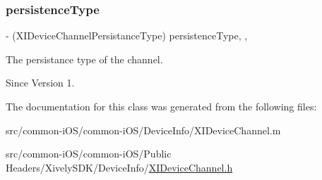 \subsubsection{\texorpdfstring{persistence\+Type}{persistenceType}}
{\footnotesize\ttfamily -\/ (X\+I\+Device\+Channel\+Persistance\+Type) persistence\+Type\hspace{0.3cm}{\ttfamily [read]}, {\ttfamily [nonatomic]}, {\ttfamily [assign]}}



The persistance type of the channel. 

\begin{DoxySince}{Since}
Version 1. 
\end{DoxySince}


The documentation for this class was generated from the following files\+:\begin{DoxyCompactItemize}
\item 
src/common-\/i\+O\+S/common-\/i\+O\+S/\+Device\+Info/X\+I\+Device\+Channel.\+m\item 
src/common-\/i\+O\+S/common-\/i\+O\+S/\+Public Headers/\+Xively\+S\+D\+K/\+Device\+Info/\hyperlink{_x_i_device_channel_8h}{X\+I\+Device\+Channel.\+h}\end{DoxyCompactItemize}
